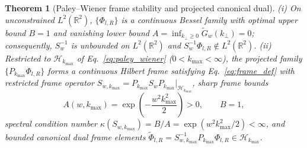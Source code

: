 \documentclass[aps,pra,reprint,amsmath,amssymb,floatfix,longbibliography]{revtex4-2}
\newtheorem{theorem}{Theorem}
\begin{document}
\begin{theorem}[Paley--Wiener frame stability and projected canonical dual]
\label{thm:pw_bounds}
(i) On unconstrained $L^2(\mathbb{R}^2)$, $\{\Phi_{l,R}\}$ is a continuous Bessel family with optimal upper bound $B = 1$ and vanishing lower bound $A = \inf_{k_\perp \ge 0} \widetilde{G}_w(k_\perp) = 0$; consequently, $S_w^{-1}$ is unbounded on $L^2(\mathbb{R}^2)$ and $S_w^{-1}\Phi_{l,R} \notin L^2(\mathbb{R}^2)$. (ii) Restricted to $\mathcal{H}_{k_{\max}}$ of Eq.~\eqref{eq:paley_wiener} ($0 < k_{\max} < \infty$), the projected family $\{P_{k_{\max}}\Phi_{l,R}\}$ forms a continuous Hilbert frame satisfying Eq.~\eqref{eq:frame_def} with restricted frame operator $S_{w,k_{\max}} = P_{k_{\max}} S_w P_{k_{\max}}\big|_{\mathcal{H}_{k_{\max}}}$, sharp frame bounds
\begin{equation}
A(w, k_{\max}) = \exp\!\left(-\frac{w^2 k_{\max}^2}{2}\right) > 0, \qquad B = 1,
\label{eq:optimal_bounds}
\end{equation}
spectral condition number $\kappa(S_{w,k_{\max}}) = B/A = \exp(w^2 k_{\max}^2/2) < \infty$, and bounded canonical dual frame elements $\widetilde{\Phi}_{l,R} = S_{w,k_{\max}}^{-1} P_{k_{\max}}\Phi_{l,R} \in \mathcal{H}_{k_{\max}}$.
\end{theorem}
\end{document}
